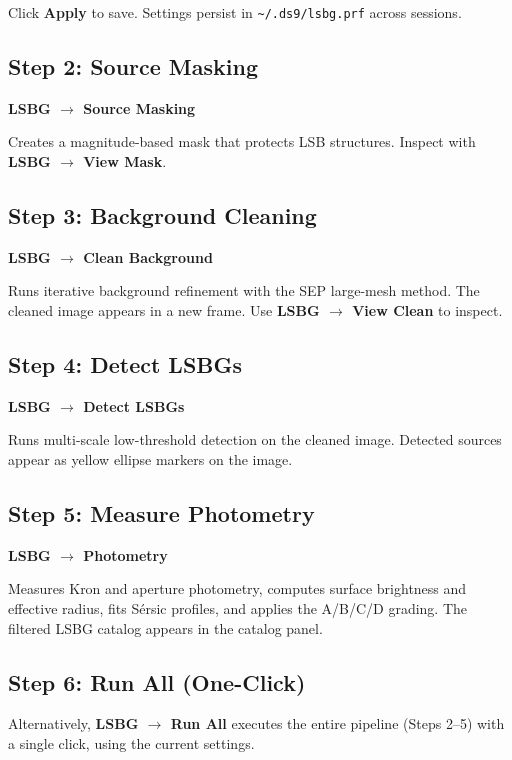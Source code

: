\documentclass[11pt,fleqn]{book}
\begin{document}
\noindent Click \textbf{Apply} to save. Settings persist in
\texttt{\~{}/.ds9/lsbg.prf} across sessions.

\subsection{Step 2: Source Masking}

\textbf{LSBG $\rightarrow$ Source Masking}

Creates a magnitude-based mask that protects LSB structures.
Inspect with \textbf{LSBG $\rightarrow$ View Mask}.

\subsection{Step 3: Background Cleaning}

\textbf{LSBG $\rightarrow$ Clean Background}

Runs iterative background refinement with the SEP large-mesh method.
The cleaned image appears in a new frame.
Use \textbf{LSBG $\rightarrow$ View Clean} to inspect.

\subsection{Step 4: Detect LSBGs}

\textbf{LSBG $\rightarrow$ Detect LSBGs}

Runs multi-scale low-threshold detection on the cleaned image.
Detected sources appear as yellow ellipse markers on the image.

\subsection{Step 5: Measure Photometry}

\textbf{LSBG $\rightarrow$ Photometry}

Measures Kron and aperture photometry, computes surface brightness and
effective radius, fits S\'ersic profiles, and applies the A/B/C/D grading.
The filtered LSBG catalog appears in the catalog panel.

\subsection{Step 6: Run All (One-Click)}

Alternatively, \textbf{LSBG $\rightarrow$ Run All} executes the entire
pipeline (Steps 2--5) with a single click, using the current settings.
\end{document}
